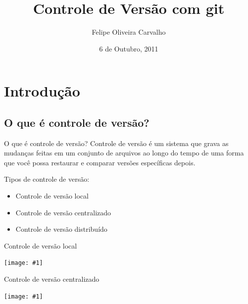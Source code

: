 \documentclass[portuguese,brazil]{beamer}
\title[Controle de Versão com git]{Controle de Versão com git}
\author{Felipe Oliveira Carvalho}
\institute{Universidade Federal de Sergipe}
\date{6 de Outubro, 2011}
\newcommand\img[1]{
  \begin{center}
    \texttt{[image: \#1]}
  \end{center}
}
\begin{document}
\begin{frame}
  \titlepage
\end{frame}

\begin{frame}
  \tableofcontents
\end{frame}

\section{Introdução}

\subsection{O que é controle de versão?}

\begin{frame}{O que é controle de versão?}
Controle de versão é um sistema que grava as mudanças feitas em um conjunto de
arquivos ao longo do tempo de uma forma que você possa restaurar e comparar versões
específicas depois.
\pause

Tipos de controle de versão:
\begin{itemize}
  \item Controle de versão local
  \item Controle de versão centralizado
  \item Controle de versão distribuído
\end{itemize}
\end{frame}

\begin{frame}{Controle de versão local}
  \img{images/localvcs.png}
\end{frame}

\begin{frame}{Controle de versão centralizado}
  \img{images/centralvcs.png}
\end{frame}
\end{document}
